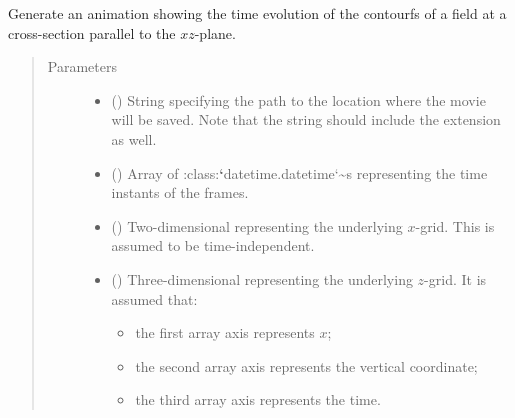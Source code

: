 \documentclass[letterpaper,10pt,english]{sphinxmanual}
\begin{document}
\begin{fulllineitems}
\label{\detokenize{api:tasmania.utils.utils_plot.animation_contourf_xz}}
Generate an animation showing the time evolution of the contourfs of a field at a cross-section
parallel to the \(xz\)-plane.
\begin{quote}\begin{description}
\item[{Parameters}] \leavevmode\begin{itemize}
\item {} 
 () \textendash{} String specifying the path to the location where the movie will be saved.
Note that the string should include the extension as well.

\item {} 
 () \textendash{} Array of :class:{\color{red}\bfseries{}{}`}datetime.datetime{}`\textasciitilde{}s representing the time instants of the frames.

\item {} 
 () \textendash{} Two-dimensional  representing the underlying \(x\)-grid.
This is assumed to be time-independent.

\item {} 
 () \textendash{} 
Three-dimensional  representing the underlying \(z\)-grid.
It is assumed that:
\begin{itemize}
\item {} 
the first array axis represents \(x\);

\item {} 
the second array axis represents the vertical coordinate;

\item {} 
the third array axis represents the time.

\end{itemize}



\end{itemize}
\end{description}
\end{quote}
\end{fulllineitems}
\end{document}
